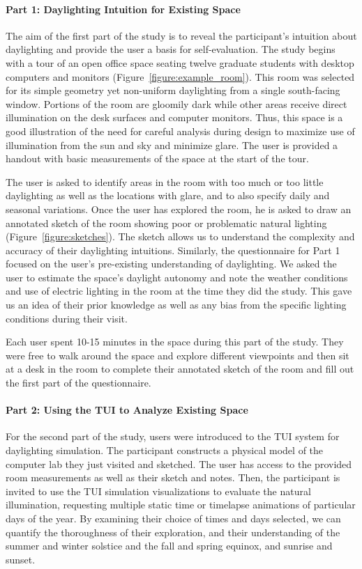 \paragraph{Part 1: Daylighting Intuition for Existing Space}

The aim of the first part of the study is to reveal the participant's
intuition about daylighting and provide the user a basis for
self-evaluation.  The study begins with a tour of an open office space
seating twelve graduate students with desktop computers and monitors
(Figure~\ref{figure:example_room}).  This room was selected for its
simple geometry yet non-uniform daylighting from a single south-facing
window.  Portions of the room are gloomily dark while other areas
receive direct illumination on the desk surfaces and computer
monitors.  Thus, this space is a good illustration of the need for
careful analysis during design to maximize use of illumination from
the sun and sky and minimize glare.  The user is provided a handout
with basic measurements of the space at the start of the tour.

The user is asked to identify areas in the room with too much or too
little daylighting as well as the locations with glare, and to also
specify daily and seasonal variations.  Once the user has explored the
room, he is asked to draw an annotated sketch of the room showing poor
or problematic natural lighting (Figure~\ref{figure:sketches}).  The
sketch allows us to understand the complexity and accuracy of their
daylighting intuitions.  Similarly, the questionnaire for Part 1
focused on the user's pre-existing understanding of daylighting.  We
asked the user to estimate the space's daylight autonomy and note the
weather conditions and use of electric lighting in the room at the
time they did the study.  This gave us an idea of their prior
knowledge as well as any bias from the specific lighting conditions
during their visit.

Each user spent 10-15 minutes in the space during this part of the
study.  They were free to walk around the space and explore different
viewpoints and then sit at a desk in the room to complete their
annotated sketch of the room and fill out the first part of the
questionnaire.


\paragraph{Part 2: Using the TUI to Analyze Existing Space}

For the second part of the study, users were introduced to the TUI
system for daylighting simulation.  The participant constructs a
physical model of the computer lab they just visited and sketched.
The user has access to the provided room measurements as well as their
sketch and notes.  Then, the participant is invited to use the TUI
simulation visualizations to evaluate the natural illumination,
requesting multiple static time or timelapse animations of particular
days of the year.  By examining their choice of times and days
selected, we can quantify the thoroughness of their exploration, and
their understanding of the summer and winter solstice and the fall and
spring equinox, and sunrise and sunset.

